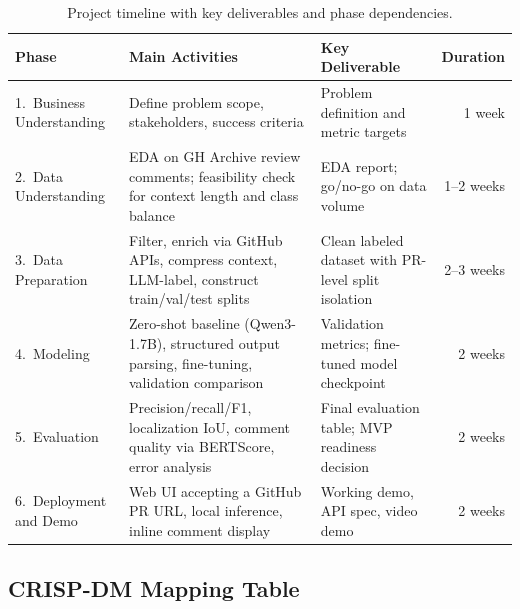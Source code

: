 \documentclass[11pt]{article}
\begin{document}
\begin{table}[H]
\centering
\caption{Project timeline with key deliverables and phase dependencies.}
\label{tab:project_plan}
\begin{tabular}{@{}p{3.5cm}p{4.5cm}p{4.5cm}r@{}}
\toprule
\textbf{Phase} & \textbf{Main Activities} & \textbf{Key Deliverable} & \textbf{Duration} \\ \midrule
1.\ Business Understanding & Define problem scope, stakeholders, success criteria & Problem definition and metric targets & 1 week \\ \midrule
2.\ Data Understanding & EDA on GH Archive review comments; feasibility check for context length and class balance & EDA report; go/no-go on data volume & 1--2 weeks \\ \midrule
3.\ Data Preparation & Filter, enrich via GitHub APIs, compress context, LLM-label, construct train/val/test splits & Clean labeled dataset with PR-level split isolation & 2--3 weeks \\ \midrule
4.\ Modeling & Zero-shot baseline (Qwen3-1.7B), structured output parsing, fine-tuning, validation comparison & Validation metrics; fine-tuned model checkpoint & 2 weeks \\ \midrule
5.\ Evaluation & Precision/recall/F1, localization IoU, comment quality via BERTScore, error analysis & Final evaluation table; MVP readiness decision & 2 weeks \\ \midrule
6.\ Deployment and Demo & Web UI accepting a GitHub PR URL, local inference, inline comment display & Working demo, API spec, video demo & 2 weeks \\ \bottomrule
\end{tabular}
\end{table}

\subsection*{CRISP-DM Mapping Table}
\end{document}
